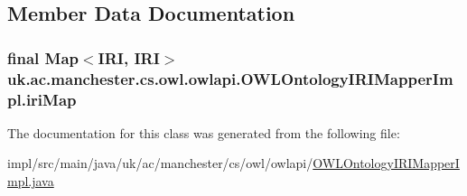 \subsection{Member Data Documentation}
\hypertarget{classuk_1_1ac_1_1manchester_1_1cs_1_1owl_1_1owlapi_1_1_o_w_l_ontology_i_r_i_mapper_impl_a1eceb7a755a03d7812cde1970b7ace78}{
\subsubsection[{iri\-Map}]{\setlength{\rightskip}{0pt plus 5cm}final Map$<${\bf I\-R\-I}, {\bf I\-R\-I}$>$ uk.\-ac.\-manchester.\-cs.\-owl.\-owlapi.\-O\-W\-L\-Ontology\-I\-R\-I\-Mapper\-Impl.\-iri\-Map\hspace{0.3cm}{\ttfamily [private]}}}\label{classuk_1_1ac_1_1manchester_1_1cs_1_1owl_1_1owlapi_1_1_o_w_l_ontology_i_r_i_mapper_impl_a1eceb7a755a03d7812cde1970b7ace78}


The documentation for this class was generated from the following file\-:\begin{DoxyCompactItemize}
\item 
impl/src/main/java/uk/ac/manchester/cs/owl/owlapi/\hyperlink{_o_w_l_ontology_i_r_i_mapper_impl_8java}{O\-W\-L\-Ontology\-I\-R\-I\-Mapper\-Impl.\-java}\end{DoxyCompactItemize}
